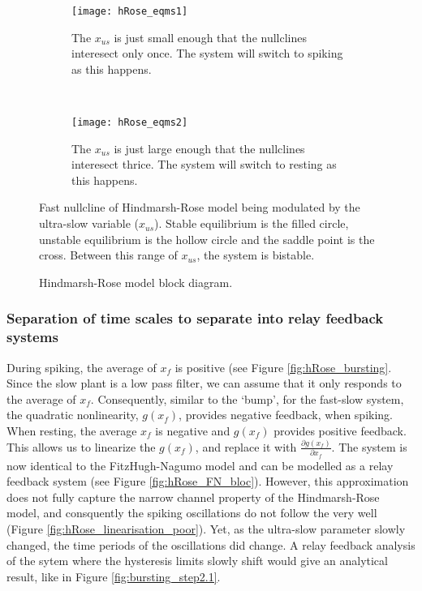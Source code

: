 \documentclass[a4paper, 12pt]{article}
\begin{document}
\begin{figure}[h!]
    \centering
    \begin{subfigure}[t]{0.48\textwidth}
        \texttt{[image: hRose\_eqms1]}
        \caption{The $x_{us}$ is just small enough that the nullclines interesect only once. The system will switch to spiking as this happens.}
        \label{fig:hRose_eqms1}
    \end{subfigure}
    ~ %
    \begin{subfigure}[t]{0.48\textwidth}
        \texttt{[image: hRose\_eqms2]}
        \caption{The $x_{us}$ is just large enough that the nullclines interesect thrice. The system will switch to resting as this happens.}
        \label{fig:hRose_eqms2}
    \end{subfigure}
\caption{Fast nullcline of Hindmarsh-Rose model being modulated by the ultra-slow variable ($x_{us}$). Stable equilibrium is the filled circle, unstable equilibrium is the hollow circle and the saddle point is the cross. Between this range of $x_{us}$, the system is bistable.}
\label{fig:hRose_changing_eqms}
\end{figure}

\begin{figure}[h!]
\caption{Hindmarsh-Rose model block diagram.}
\label{fig:hRose_block_diagram}
\end{figure}

\subsubsection{Separation of time scales to separate into relay feedback systems}
During spiking, the average of $x_f$ is positive (see Figure \ref{fig:hRose_bursting}. Since the slow plant is a low pass filter, we can assume that it only responds to the average of $x_f$. Consequently, similar to the `bump', for the fast-slow system, the quadratic nonlinearity, $g(x_f)$, provides negative feedback, when spiking. When resting, the average $x_f$ is negative and $g(x_f)$ provides positive feedback. This allows us to linearize the $g(x_f)$, and replace it with $\tfrac{\partial g(x_f)}{\partial x_f}$. The system is now identical to the FitzHugh-Nagumo model and can be modelled as a relay feedback system (see Figure \ref{fig:hRose_FN_bloc}). However, this approximation does not fully capture the narrow channel property of the Hindmarsh-Rose model, and consquently the spiking oscillations do not follow the very well (Figure \ref{fig:hRose_linearisation_poor}). Yet, as the ultra-slow parameter slowly changed, the time periods of the oscillations did change. A relay feedback analysis of the sytem where the hysteresis limits slowly shift would give an analytical result, like in Figure \ref{fig:bursting_step2.1}. 
\end{document}
